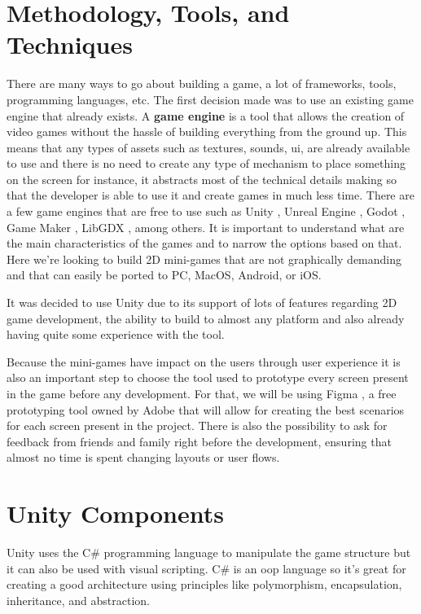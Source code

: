 
\section{Methodology, Tools, and Techniques}
\label{methodology}
There are many ways to go about building a game, a lot of frameworks, tools, programming languages, etc. The first decision made was to use an existing game engine that already exists. A \textbf{game engine} is a tool that allows the creation of video games without the hassle of building everything from the ground up. This means that any types of assets such as textures, sounds, \gls{ui}, are already available to use and there is no need to create any type of mechanism to place something on the screen for instance, it abstracts most of the technical details making so that the developer is able to use it and create games in much less time. There are a few game engines that are free to use such as Unity \cite{unity}, Unreal Engine \cite{unrealengine}, Godot \cite{godot}, Game Maker \cite{gamemaker}, LibGDX \cite{libgdx}, among others.
It is important to understand what are the main characteristics of the games and to narrow the options based on that.
Here we're looking to build 2D mini-games that are not graphically demanding and that can easily be ported to PC, MacOS, Android, or iOS.

It was decided to use Unity due to its support of lots of features regarding 2D game development, the ability to build to almost any platform and also already having quite some experience with the tool.

Because the mini-games have impact on the users through user experience it is also an important step to choose the tool used to prototype every screen present in the game before any development. For that, we will be using Figma \cite{figma}, a free prototyping tool owned by Adobe that will allow for creating the best scenarios for each screen present in the project. There is also the possibility to ask for feedback from friends and family right before the development, ensuring that almost no time is spent changing layouts or user flows.

\section{Unity Components}
\label{unityComponents}
Unity uses the C\# programming language to manipulate the game structure but it can also be used with visual scripting. C\# is an \gls{oop} language so it's great for creating a good architecture using principles like polymorphism, encapsulation, inheritance, and abstraction.

